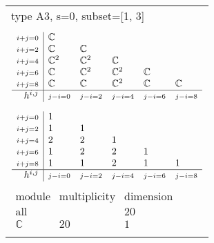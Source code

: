 \documentclass[crop,border=2mm]{standalone}
\begin{document}
\begin{tabular}{l}
{\huge type A3, s=0, subset=[1, 3]}\\ \\


$\displaystyle
\begin{array}{r|l l l l l}
	{\scriptstyle i+j=0}&\mathbb{C}&&&&\\
	{\scriptstyle i+j=2}&\mathbb{C}&\mathbb{C}&&&\\
	{\scriptstyle i+j=4}&\mathbb{C}^{2}&\mathbb{C}^{2}&\mathbb{C}&&\\
	{\scriptstyle i+j=6}&\mathbb{C}&\mathbb{C}^{2}&\mathbb{C}^{2}&\mathbb{C}&\\
	{\scriptstyle i+j=8}&\mathbb{C}&\mathbb{C}&\mathbb{C}^{2}&\mathbb{C}&\mathbb{C}\\
	\hline h^{i,j}&{\scriptstyle j-i=0}&{\scriptstyle j-i=2}&{\scriptstyle j-i=4}&{\scriptstyle j-i=6}&{\scriptstyle j-i=8}
\end{array}
$ \\ \\


$\displaystyle
\begin{array}{r|l l l l l}
	{\scriptstyle i+j=0}&1&&&&\\
	{\scriptstyle i+j=2}&1&1&&&\\
	{\scriptstyle i+j=4}&2&2&1&&\\
	{\scriptstyle i+j=6}&1&2&2&1&\\
	{\scriptstyle i+j=8}&1&1&2&1&1\\
	\hline h^{i,j}&{\scriptstyle j-i=0}&{\scriptstyle j-i=2}&{\scriptstyle j-i=4}&{\scriptstyle j-i=6}&{\scriptstyle j-i=8}
\end{array}
$ \\ \\


$\displaystyle
\begin{array}{rll}
	\text{module}&\text{multiplicity}&\text{dimension} \\ \hline \text{all}&&20 \\
	\mathbb{C}&20&1
\end{array}
$ \\ \\

\end{tabular}
\end{document}
